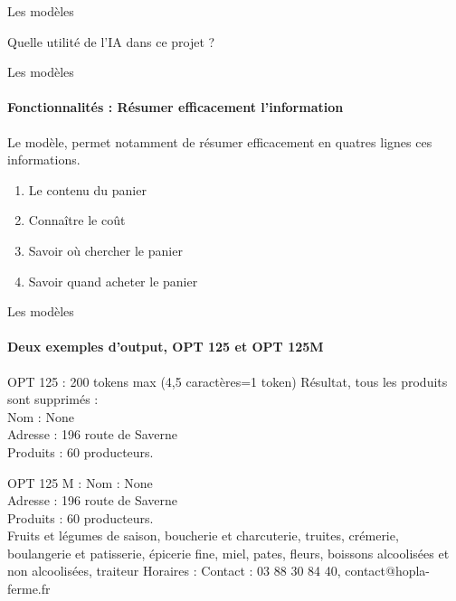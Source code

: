 \documentclass{beamer}
\begin{document}
\begin{frame}{Les modèles}

\begin{center}
    \Large Quelle utilité de l’IA dans ce projet ?
\end{center}

\end{frame}

\begin{frame}{Les modèles}
\framesubtitle{Fonctionnalités : Résumer efficacement l’information}
Le modèle, permet notamment de résumer efficacement en quatres lignes ces informations.

\begin{enumerate}
    \item Le contenu du panier
    \item Connaître le coût
    \item Savoir où chercher le panier
    \item Savoir quand acheter le panier
\end{enumerate}
\end{frame}

\begin{frame}{Les modèles}
\framesubtitle{Deux exemples d'output, OPT 125 et OPT 125M}

\begin{block}{OPT 125 : 200 tokens max (4,5 caractères=1 token)}
Résultat, tous les produits sont supprimés :\\
Nom : None\\
Adresse : 196 route de Saverne\\
Produits : 60 producteurs.\\

\end{block}


\begin{block}{OPT 125 M :}
Nom : None\\
Adresse : 196 route de Saverne\\
Produits : 60 producteurs. \\                                              Fruits et légumes de saison, boucherie et charcuterie, truites, crémerie, boulangerie et patisserie, épicerie fine, miel, pates, fleurs, boissons alcoolisées et non alcoolisées, traiteur
Horaires : 
Contact : 03 88 30 84 40, contact@hopla-ferme.fr

\end{block}

\end{frame}
\end{document}
